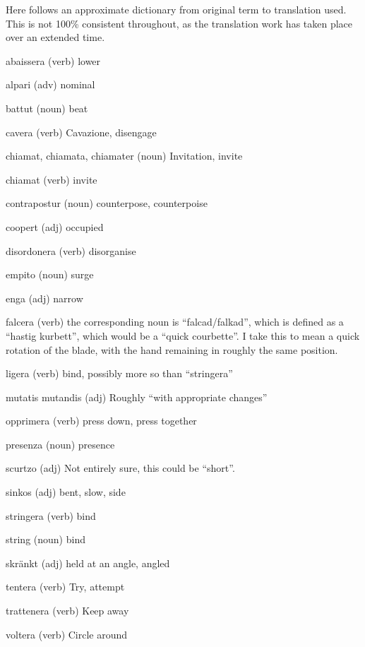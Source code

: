 \newpage
{}

Here follows an approximate dictionary from original term to translation used. This is not 100\% consistent throughout, as the translation work has taken place over an extended time.

\begin{description}
\item{abaissera} (verb) lower
\item{alpari} (adv) nominal
\item{battut} (noun) beat
\item{cavera} (verb) Cavazione, disengage
\item{chiamat, chiamata, chiamater} (noun) Invitation, invite
\item{chiamat} (verb) invite
\item{contrapostur} (noun) counterpose, counterpoise
\item{coopert} (adj) occupied
\item{disordonera} (verb) disorganise
\item{empito} (noun) surge
\item{enga} (adj) narrow
\item{falcera} (verb) the corresponding noun is ``falcad/falkad'', which is defined as a ``hastig kurbett'', which would be a ``quick courbette''. I take this to mean a quick rotation of the blade, with the hand remaining in roughly the same position.
\item{ligera} (verb) bind, possibly more so than ``stringera''
\item{mutatis mutandis} (adj) Roughly ``with appropriate changes''
\item{opprimera} (verb) press down, press together
\item{presenza} (noun) presence
\item{scurtzo} (adj) Not entirely sure, this could be ``short''.
\item{sinkos} (adj) bent, slow, side
\item{stringera} (verb) bind
\item{string} (noun) bind
\item{skränkt} (adj) held at an angle, angled
\item{tentera} (verb) Try, attempt
\item{trattenera} (verb) Keep away
\item{voltera} (verb) Circle around
\end{description}
